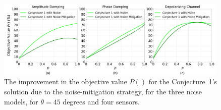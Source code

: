 \begin{figure}[t]
    \centering
    \includegraphics[width=0.99\textwidth]{chapters/tqc/figures/povmnoise.png}
    \caption{The improvement in the objective value $P()$ for the Conjecture~1's solution due to the noise-mitigation strategy, for the three noise models, for $\theta=45$ degrees and four sensors.}
    \label{fig:povm_noise}
\end{figure}


